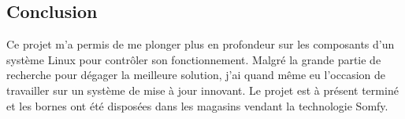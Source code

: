 \subsection{Conclusion}

Ce projet m'a permis de me plonger plus en profondeur sur les composants d'un système Linux pour contrôler son fonctionnement.
Malgré la grande partie de recherche pour dégager la meilleure solution, j'ai quand même eu l'occasion de travailler sur un système de mise à jour innovant.
Le projet est à présent terminé et les bornes ont été disposées dans les magasins vendant la technologie Somfy.
